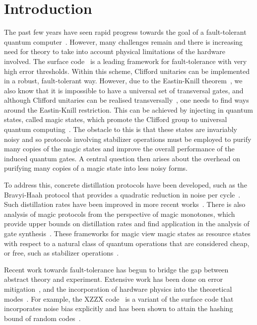 \documentclass[pra,
aps,
twocolumn,
superscriptaddress,
groupedaddress,
nofootinbib,
reprint
]{revtex4-1}
\begin{document}
\section{Introduction}
\label{sec:intro}

The past few years have seen rapid progress towards the goal of a fault-tolerant quantum computer~\cite{Fowler_2012, Herrera_2010, Nickerson_2014, Nikahd_2017, chao_2018, lin_pieceable_2020, Lin_2020, Bourassa_2021}. However, many challenges remain and there is increasing need for theory to take into account physical limitations of the hardware involved. The surface code~\cite{Bravyi_1998, Freedman_2001, Dennis_2002, Raussendorf_2007} is a leading framework for fault-tolerance with very high error thresholds. Within this scheme, Clifford unitaries can be implemented in a robust, fault-tolerant way. However, due to the Eastin-Knill theorem~\cite{Eastin_2009}, we also know that it is impossible to have a universal set of transversal gates, and although Clifford unitaries can be realised transversally~\cite{Calderbank_1996, Steane_1996}, one needs to find ways around the Eastin-Knill restriction. This can be achieved by injecting in quantum states, called magic states, which promote the Clifford group to universal quantum computing~\cite{cit:bravyi}. The obstacle to this is that these states are invariably noisy and so protocols involving stabilizer operations must be employed to purify many copies of the magic states and improve the overall performance of the induced quantum gates. A central question then arises about the overhead on purifying many copies of a magic state into less noisy forms. 

To address this, concrete distillation protocols have been developed, such as the Bravyi-Haah protocol that provides a quadratic reduction in noise per cycle~\cite{Bravyi2012}. Such distillation rates have been improved in more recent works~\cite{Hastings2018, Litinski_2019, Krishna2019, cit:prakash}. There is also analysis of magic protocols from the perspective of magic monotones, which provide upper bounds on distillation rates and find application in the analysis of gate synthesis~\cite{Campbell_2017, Howard_2017, Prakash_2018}. These frameworks for magic view magic states as resource states with respect to a natural class of quantum operations that are considered cheap, or free, such as stabilizer operations~\cite{Gour_2019, cit:ahmadi, cit:seddon, Wang_2019}.
  
  
Recent work towards fault-tolerance has begun to bridge the gap between abstract theory and experiment. Extensive work has been done on error mitigation~\cite{Li_2017, Temme_2017, Endo_2018, McClean_2017}, and the incorporation of hardware physics into the theoretical modes~\cite{Kandala_2019, Colless_2018, song2018quantum, Bravyi_2021}. For example, the XZZX code~\cite{bonilla_ataides_xzzx_2021} is a variant of the surface code that incorporates noise bias explicitly and has been shown to attain the hashing bound of random codes~\cite{Bennett_1996}. 
\end{document}
